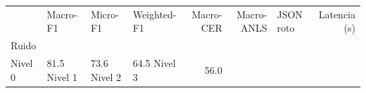 \begin{tabular}{llllrrlr}
\toprule
 & Macro-F1 & Micro-F1 & Weighted-F1 & Macro-CER & Macro-ANLS & JSON roto & Latencia (s) \\
Ruido &  &  &  &  &  &  &  \\
\midrule
Nivel 0 & 81.5%
Nivel 1 & 73.6%
Nivel 2 & 64.5%
Nivel 3 & 56.0%
\bottomrule
\end{tabular}
